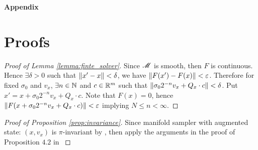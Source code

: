 \documentclass{article}
\begin{document}
\nocite{*}



\newpage




\clearpage
\appendix
\begin{center}
{\LARGE \textbf{Appendix}}  
\end{center}
\renewcommand{\thefigure}{\thesection.\arabic{figure}}
\renewcommand{\thetable}{\thesection.\arabic{table}}
\setcounter{figure}{0}  %
\setcounter{table}{0}   %
\setcounter{algorithm}{0}  %



\section{Proofs}
\begin{proof}[Proof of Lemma \ref{lemma:finte_solver}]
Since $\mathscr{M}$ is smooth, then $F$ is continuous. Hence $\exists \delta > 0$ such that $\left\lVert x' - x\right\rVert < \delta$, we have $\left\lVert F(x') - F(x)\right\rVert < \varepsilon$. Therefore for fixed $\sigma_0$ and $v_x$, $\exists n \in \mathbb N$ and $c \in \mathbb R^m$ such that $\left\lVert\sigma_0 2^{-n} v_x + Q_x \cdot c\right\rVert < \delta$. Put $x' = x + \sigma_0 2^{-n} v_x + Q_x \cdot c$. Note that $F(x) = 0$, hence $\left\lVert F(x + \sigma_0 2^{-n} v_x + Q_x \cdot c)\right\rVert < \varepsilon$ implying $N \leq n < \infty$.



\end{proof}


\begin{proof}[Proof of Proposition \ref{prop:invariance}]
Since manifold sampler with augmented state: $(x, v_x)$ is $\pi$-invariant by \cite{manifoldparent}, then apply the arguments in the proof of Proposition $4.2$ in \cite{autostep}
\end{proof}


\end{document}
